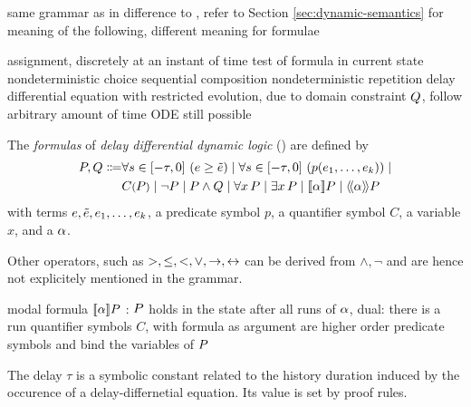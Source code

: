         same grammar as in \cite{Platzer15Uniform}
        difference to \dL, refer to Section \ref{sec:dynamic-semantics} for meaning of the following, different meaning for formulae

        assignment, discretely at an instant of time
        test of formula in current state
        nondeterministic choice
        sequential composition
        nondeterministic repetition
        delay differential equation with restricted evolution, due to domain constraint $Q$, follow arbitrary amount of time
        ODE still possible



    \begin{definition}\label{def:syntax-formula}
        The \emph{formulas} of \emph{delay differential dynamic logic} (\ddL) are defined by
        \begin{align}
            \asfml,\bsfml \Coloneqq
                &\delay{\astrm\geq\bstrm} \mid
                \delay{p(\range{\istrm{1}}{\istrm{k}})} \mid\\
                &\contextapp{C}{\asfml} \mid
                \lnot\asfml \mid
                \asfml\land\bsfml \mid
                \lforall{x}{\asfml} \mid
                \lexists{x}{\asfml} \mid
                \dbox{\asprg}{\asfml} \mid
                \ddiamond{\asprg}{\asfml}
        \end{align}
        with terms $e,\tilde{e},e_{1},\ldots,e_{k}$,
        a predicate symbol $p$, a quantifier symbol $C$, a variable $x$, and a \HP $\alpha$.
        
        Other operators, such as $>,\leq,<,\lor,\rightarrow,\leftrightarrow$ can be derived from $\land,\lnot$ and are hence not explicitely mentioned in the grammar.

        modal formula $\dbox{\asprg}{\asfml}$ : $P$ holds in the state after all runs of $\alpha$, dual: there is a run
        quantifier symbols $C$, with formula as argument are higher order predicate symbols and bind the variables of $P$

        The delay $\tau$ is a symbolic constant related to the history duration induced by the occurence of a delay-differnetial equation. Its value is set by proof rules.
    \end{definition}

